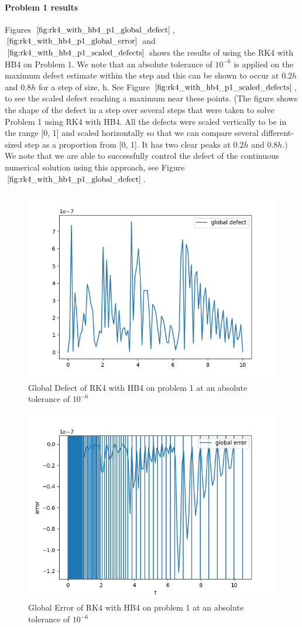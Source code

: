 \documentclass{article}
\begin{document}
\paragraph{Problem 1 results}
Figures $\ref{fig:rk4_with_hb4_p1_global_defect}$, $\ref{fig:rk4_with_hb4_p1_global_error}$ and $\ref{fig:rk4_with_hb4_p1_scaled_defects}$ shows the results of using the RK4 with HB4 on Problem 1. We note that an absolute tolerance of $10^{-6}$ is applied on the maximum defect estimate within the step and this can be shown to occur at $0.2h$ and $0.8h$ for a step of size, h. See Figure $\ref{fig:rk4_with_hb4_p1_scaled_defects}$, to see the scaled defect reaching a maximum near these points. (The figure shows the shape of the defect in a step over several steps that were taken to solve Problem 1 using RK4 with HB4. All the defects were scaled vertically to be in the range [0, 1] and scaled horizontally so that we can compare several different-sized step as a proportion from [0, 1]. It has two clear peaks at $0.2h$ and $0.8h$.) We note that we are able to successfully control the defect of the continuous numerical solution using this approach, see Figure $\ref{fig:rk4_with_hb4_p1_global_defect}$.

\begin{figure}[H]
\centering
\includegraphics[width=0.7\linewidth]{./figures/rk4_with_hb4_p1_global_defect}
\caption{Global Defect of RK4 with HB4 on problem 1 at an absolute tolerance of $10^{-6}$}
\label{fig:rk4_with_hb4_p1_global_defect}
\end{figure}

\begin{figure}[H]
\centering
\includegraphics[width=0.7\linewidth]{./figures/rk4_with_hb4_p1_global_error}
\caption{Global Error of RK4 with HB4 on problem 1 at an absolute tolerance of $10^{-6}$}
\label{fig:rk4_with_hb4_p1_global_error}
\end{figure}
\end{document}
